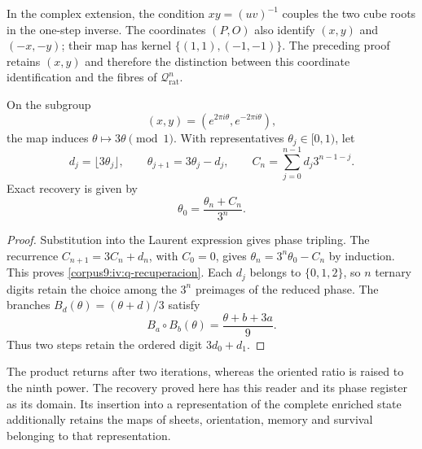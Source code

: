In the complex extension, the condition \(xy=(uv)^{-1}\)
couples the two cube roots in the one-step inverse. The
coordinates \((P,O)\) also identify
\((x,y)\) and \((-x,-y)\); their map has kernel
\(\{(1,1),(-1,-1)\}\). The preceding proof retains \((x,y)\)
and therefore the distinction between this coordinate
identification and the fibres of \(\mathcal Q_{\mathrm{rat}}^n\).

\begin{proposition}
\label{corpus9:iv:q-acarreo}
On the subgroup
\[
 (x,y)=(e^{2\pi i\theta},e^{-2\pi i\theta}),
\]
the map induces \(\theta\mapsto3\theta\pmod1\).
With representatives \(\theta_j\in[0,1)\), let
\[
 d_j=\lfloor3\theta_j\rfloor,\qquad
 \theta_{j+1}=3\theta_j-d_j,\qquad
 C_n=\sum_{j=0}^{n-1}d_j3^{n-1-j}.
\]
Exact recovery is given by
\begin{equation}
 \theta_0=\frac{\theta_n+C_n}{3^n}.
 \label{corpus9:iv:q-recuperacion}
\end{equation}
\end{proposition}
\begin{proof}
Substitution into the Laurent expression gives phase tripling.
The recurrence \(C_{n+1}=3C_n+d_n\), with \(C_0=0\),
gives \(\theta_n=3^n\theta_0-C_n\) by induction. This proves
\eqref{corpus9:iv:q-recuperacion}. Each \(d_j\) belongs to
\(\{0,1,2\}\), so \(n\) ternary digits retain
the choice among the \(3^n\) preimages of the reduced phase.
The branches \(B_d(\theta)=(\theta+d)/3\) satisfy
\[
 B_a\circ B_b(\theta)=\frac{\theta+b+3a}{9}.
\]
Thus two steps retain the ordered digit \(3d_0+d_1\).
\end{proof}

The product returns after two iterations, whereas the oriented
ratio is raised to the ninth power. The recovery proved here
has this reader and its phase register as its domain. Its insertion
into a representation of the complete enriched state additionally
retains the maps of sheets, orientation, memory and
survival belonging to that representation.
